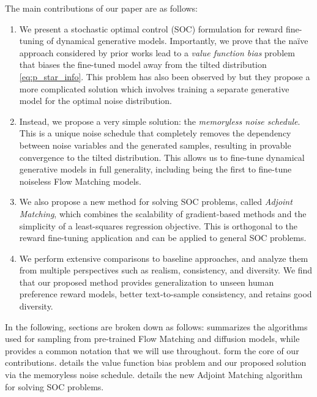 \documentclass[]{fairmeta}
\begin{document}
The main contributions of our paper are as follows:
\begin{enumerate}[label=(\roman*)]
    \item We present a stochastic optimal control (SOC) formulation for reward fine-tuning of dynamical generative models. Importantly, we prove that the na\"ive approach considered by prior works lead to a \emph{value function bias} problem that biases the fine-tuned model away from the tilted distribution \eqref{eq:p_star_info}. 
    This problem has also been observed by \citet{uehara2024finetuning} but they propose a more complicated solution which involves training a separate generative model for the optimal noise distribution.
    \item Instead, we propose a very simple solution: the \emph{memoryless noise schedule}. This is a unique noise schedule that completely removes the dependency between noise variables and the generated samples, resulting in provable convergence to the tilted distribution. 
    This allows us to fine-tune dynamical generative models in full generality, including being the first to fine-tune noiseless Flow Matching models.
    \item We also propose a new method for solving SOC problems, called \emph{Adjoint Matching}, which combines the scalability of gradient-based methods and the simplicity of a least-squares regression objective. This is orthogonal to the reward fine-tuning application and can be applied to general SOC problems.
    \item We perform extensive comparisons to baseline approaches, and analyze them from multiple perspectives such as realism, consistency, and diversity. We find that our proposed method provides generalization to unseen human preference reward models, better text-to-sample consistency, and retains good diversity.
\end{enumerate}
In the following, sections are broken down as follows:  summarizes the algorithms used for sampling from pre-trained Flow Matching and diffusion models, while  provides a common notation that we will use throughout.  form the core of our contributions.  details the value function bias problem and our proposed solution via the memoryless noise schedule.  details the new Adjoint Matching algorithm for solving SOC problems. 
\end{document}
